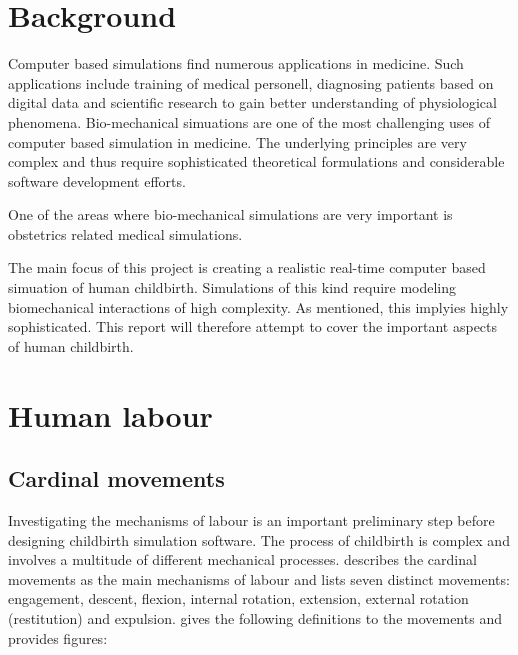 \section{Background}\label{intro-background}

Computer based simulations find numerous applications in medicine. Such applications include training of medical personell, diagnosing patients based on digital data and scientific research to gain better understanding of physiological phenomena. Bio-mechanical simuations are one of the most challenging uses of computer based simulation in medicine. The underlying principles are very complex and thus require sophisticated theoretical formulations and considerable software development efforts.

One of the areas where bio-mechanical simulations are very important is obstetrics related medical simulations.

The main focus of this project is creating a realistic real-time computer based simuation of human childbirth. Simulations of this kind require modeling biomechanical interactions of high complexity. As mentioned, this implyies highly sophisticated. This report will therefore attempt to cover the important aspects of human childbirth.

\section{Human labour}
\subsection{Cardinal movements}
Investigating the mechanisms of labour is an important preliminary step before designing childbirth simulation software. The process of childbirth is complex and involves a multitude of different mechanical processes. \citet{GABBE91} describes the cardinal movements as the main mechanisms of labour and lists seven distinct movements: engagement, descent, flexion, internal rotation, extension, external rotation (restitution) and expulsion. \citet{NORMALLABOUR} gives the following definitions to the movements and provides figures:

